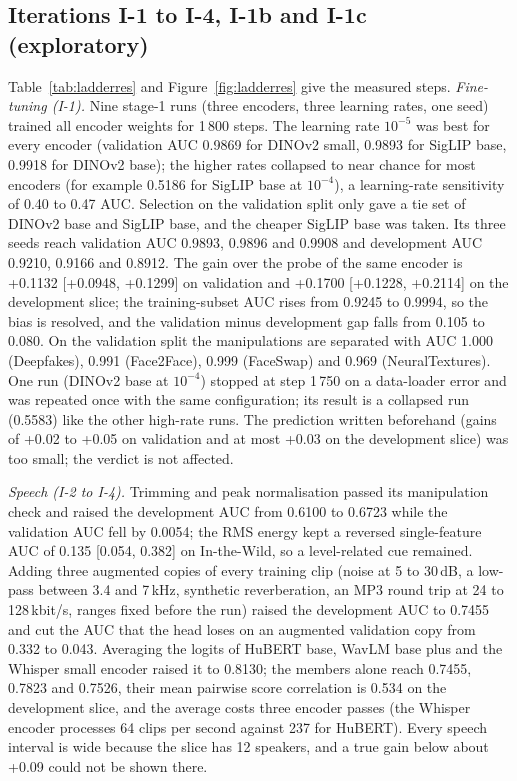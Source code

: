 \documentclass[conference,a4paper]{IEEEtran_nodash}
\begin{document}
\subsection{Iterations I-1 to I-4, I-1b and I-1c (exploratory)}
Table~\ref{tab:ladderres} and Figure~\ref{fig:ladderres} give the measured
steps. \emph{Fine-tuning (I-1).} Nine stage-1 runs (three encoders, three
learning rates, one seed) trained all encoder weights for 1\,800 steps. The
learning rate $10^{-5}$ was best for every encoder (validation AUC 0.9869 for
DINOv2 small, 0.9893 for SigLIP base, 0.9918 for DINOv2 base); the higher rates
collapsed to near chance for most encoders (for example 0.5186 for SigLIP base at
$10^{-4}$), a learning-rate sensitivity of 0.40 to 0.47 AUC. Selection on the
validation split only gave a tie set of DINOv2 base and SigLIP base, and the
cheaper SigLIP base was taken. Its three seeds reach validation AUC 0.9893,
0.9896 and 0.9908 and development AUC 0.9210, 0.9166 and 0.8912. The gain over
the probe of the same encoder is +0.1132 [+0.0948, +0.1299] on validation and
+0.1700 [+0.1228, +0.2114] on the development slice; the training-subset AUC
rises from 0.9245 to 0.9994, so the bias is resolved, and the validation minus
development gap falls from 0.105 to 0.080. On the validation split the
manipulations are separated with AUC 1.000 (Deepfakes), 0.991 (Face2Face), 0.999
(FaceSwap) and 0.969 (NeuralTextures). One run (DINOv2 base at $10^{-4}$) stopped
at step 1\,750 on a data-loader error and was repeated once with the same
configuration; its result is a collapsed run (0.5583) like the other high-rate
runs. The prediction written beforehand (gains of +0.02 to +0.05 on validation
and at most +0.03 on the development slice) was too small; the verdict is not
affected.

\emph{Speech (I-2 to I-4).} Trimming and peak normalisation passed its
manipulation check and raised the development AUC from 0.6100 to 0.6723 while
the validation AUC fell by 0.0054; the RMS energy kept a reversed single-feature
AUC of 0.135 [0.054, 0.382] on In-the-Wild, so a level-related cue remained.
Adding three augmented copies of every training clip (noise at 5 to 30\,dB,
a low-pass between 3.4 and 7\,kHz, synthetic reverberation, an MP3 round trip at
24 to 128\,kbit/s, ranges fixed before the run) raised the development AUC to
0.7455 and cut the AUC that the head loses on an augmented validation copy
from 0.332 to 0.043. Averaging the logits of HuBERT base, WavLM base plus and the
Whisper small encoder raised it to 0.8130; the members alone reach 0.7455, 0.7823
and 0.7526, their mean pairwise score correlation is 0.534 on the development
slice, and the average costs three encoder passes (the Whisper encoder
processes 64 clips per second against 237 for HuBERT). Every speech interval is
wide because the slice has 12 speakers, and a true gain below about +0.09 could
not be shown there.
\end{document}
